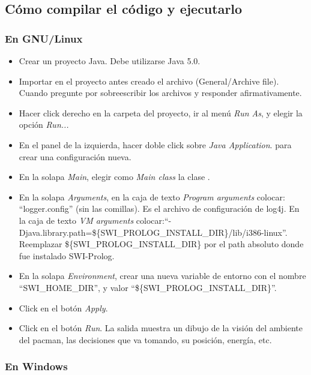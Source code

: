 \subsection{Cómo compilar el código y ejecutarlo}

\subsubsection{En GNU/Linux}
\begin{itemize}

\item Crear un proyecto Java. Debe utilizarse Java 5.0.

\item Importar en el proyecto antes creado el archivo 
(General/Archive file).  Cuando pregunte por sobreescribir los archivos
 y  responder afirmativamente.

\item Hacer click derecho en la carpeta del proyecto, ir al menú \emph{Run As},
y elegir la opción \emph{Run...}

\item En el panel de la izquierda, hacer doble click sobre \emph{Java Application}.
para crear una configuración nueva.

\item En la solapa \emph{Main}, elegir como \emph{Main class} la clase .

\item En la solapa \emph{Arguments}, en la caja de texto \emph{Program arguments} colocar:
``logger.config'' (sin las comillas). Es el archivo de configuración de log4j. En la caja de texto \emph{VM arguments}
colocar:\newline``-Djava.library.path=\$\{SWI\_PROLOG\_INSTALL\_DIR\}/lib/i386-linux''.\newline
Reemplazar \$\{SWI\_PROLOG\_INSTALL\_DIR\} por el path absoluto donde fue instalado SWI-Prolog.

\item En la solapa \emph{Environment}, crear una nueva variable de entorno con el nombre ``SWI\_HOME\_DIR'',
y valor ``\$\{SWI\_PROLOG\_INSTALL\_DIR\}''.

\item Click en el botón \emph{Apply}.

\item Click en el botón \emph{Run}. La salida muestra un dibujo de la visión del ambiente del pacman,
las decisiones que va tomando, su posición, energía, etc.

\end{itemize}

\subsubsection{En Windows}

